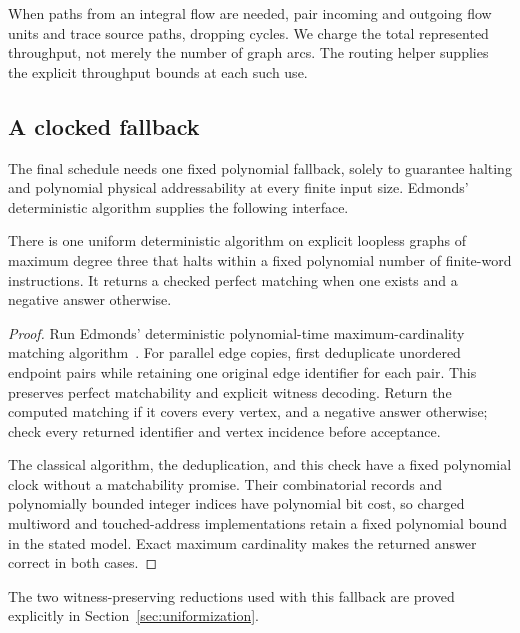 When paths from an integral flow are needed, pair incoming and outgoing flow
units and trace source paths, dropping cycles. We charge the total represented
throughput, not merely the number of graph arcs. The routing helper supplies
the explicit throughput bounds at each such use.

\subsection{A clocked fallback}

The final schedule needs one fixed polynomial fallback, solely to guarantee
halting and polynomial physical addressability at every finite input size.
Edmonds' deterministic algorithm supplies the following interface.

\begin{lemma}\label{lem:fallback}
There is one uniform deterministic algorithm on explicit loopless graphs of
maximum degree three that halts within a fixed polynomial number of finite-word
instructions. It returns a checked perfect matching when one exists and a
negative answer otherwise.
\end{lemma}

\begin{proof}
Run Edmonds' deterministic polynomial-time maximum-cardinality matching
algorithm~\cite[Section~2, pp.~451--452]{EdmondsPaths}. For parallel edge
copies, first deduplicate unordered endpoint pairs while retaining one
original edge identifier for each pair. This preserves perfect matchability
and explicit witness decoding. Return the computed matching if it covers
every vertex, and a negative answer otherwise; check every returned identifier and
vertex incidence before acceptance.

The classical algorithm, the deduplication, and this check have a fixed
polynomial clock without a matchability promise. Their combinatorial records
and polynomially bounded integer indices have polynomial bit cost, so
charged multiword and touched-address implementations retain a fixed
polynomial bound in the stated model. Exact maximum cardinality makes the
returned answer correct in both cases.
\end{proof}

The two witness-preserving reductions used with this fallback are proved
explicitly in Section~\ref{sec:uniformization}.
